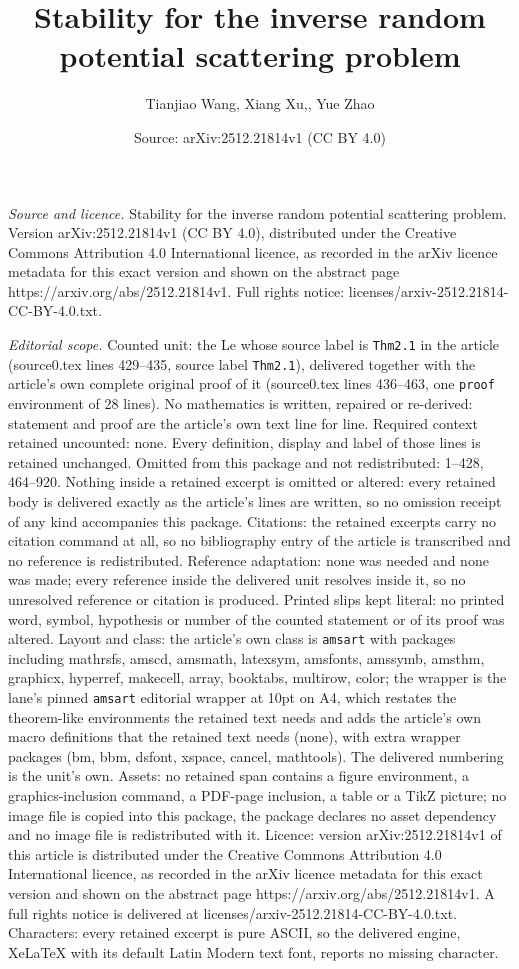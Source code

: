 \documentclass[10pt,a4paper]{amsart}
\title[Stability for the inverse random potential scattering proble]{Stability for the inverse random potential scattering problem}
\author{Tianjiao Wang, Xiang Xu,, Yue Zhao}
\date{Source: arXiv:2512.21814v1 (CC BY 4.0)}
\begin{document}
\maketitle

\noindent\emph{Source and licence.} Stability for the inverse random potential scattering problem. Version arXiv:2512.21814v1 (CC BY 4.0), distributed under the Creative Commons Attribution 4.0 International licence, as recorded in the arXiv licence metadata for this exact version and shown on the abstract page https://arxiv.org/abs/2512.21814v1. Full rights notice: licenses/arxiv-2512.21814-CC-BY-4.0.txt.\par\smallskip

\noindent\textit{Editorial scope.} Counted unit: the Le whose source label is \texttt{Thm2.1} in the article (source0.tex lines 429--435, source label \texttt{Thm2.1}), delivered together with the article's own complete original proof of it (source0.tex lines 436--463, one \texttt{proof} environment of 28 lines). No mathematics is written, repaired or re-derived: statement and proof are the article's own text line for line. Required context retained uncounted: none. Every definition, display and label of those lines is retained unchanged. Omitted from this package and not redistributed: 1--428, 464--920. Nothing inside a retained excerpt is omitted or altered: every retained body is delivered exactly as the article's lines are written, so no omission receipt of any kind accompanies this package. Citations: the retained excerpts carry no citation command at all, so no bibliography entry of the article is transcribed and no reference is redistributed. Reference adaptation: none was needed and none was made; every reference inside the delivered unit resolves inside it, so no unresolved reference or citation is produced. Printed slips kept literal: no printed word, symbol, hypothesis or number of the counted statement or of its proof was altered. Layout and class: the article's own class is \texttt{amsart} with packages including mathrsfs, amscd, amsmath, latexsym, amsfonts, amssymb, amsthm, graphicx, hyperref, makecell, array, booktabs, multirow, color; the wrapper is the lane's pinned \texttt{amsart} editorial wrapper at 10pt on A4, which restates the theorem-like environments the retained text needs and adds the article's own macro definitions that the retained text needs (none), with extra wrapper packages (bm, bbm, dsfont, xspace, cancel, mathtools). The delivered numbering is the unit's own. Assets: no retained span contains a figure environment, a graphics-inclusion command, a PDF-page inclusion, a table or a TikZ picture; no image file is copied into this package, the package declares no asset dependency and no image file is redistributed with it. Licence: version arXiv:2512.21814v1 of this article is distributed under the Creative Commons Attribution 4.0 International licence, as recorded in the arXiv licence metadata for this exact version and shown on the abstract page https://arxiv.org/abs/2512.21814v1. A full rights notice is delivered at licenses/arxiv-2512.21814-CC-BY-4.0.txt. Characters: every retained excerpt is pure ASCII, so the delivered engine, XeLaTeX with its default Latin Modern text font, reports no missing character.
\end{document}
